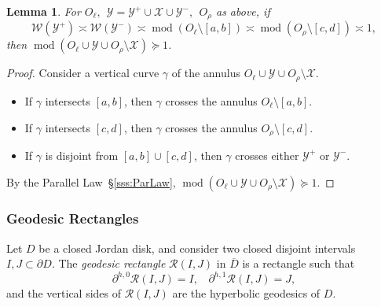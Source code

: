 \documentclass{amsart}
\renewcommand{\sp}{{\ \ }}
\newcommand{\1}{{\mathbb 1 }}
\newcommand{\Width}{{\mathcal W}}
\newcommand\YY{\mathcal{Y}}
\newcommand\RR{\mathcal{R}}
\newcommand\XX{\mathcal{X}}
\newcommand\ovl{\overline}
\newtheorem{lem}[thm]{Lemma}
\theoremstyle{remark}
\numberwithin{equation}{section}
\theoremstyle{definition}
\renewcommand{\mod}{\operatorname{mod}}
\begin{document}
\begin{lem}
\label{lem:A:encl form}
For $O_\ell,\sp \YY=\YY^+\cup \XX\cup \YY^-,\sp O_\rho$ as above, if  
\[\Width(\YY^+)\asymp \Width(\YY^-)\asymp \mod (O_\ell \setminus [a,b])\asymp \mod (O_\rho \setminus [c,d])\asymp 1, \]
then $\mod (O_\ell \cup \YY \cup O_\rho \setminus \XX) \succeq 1$.
\end{lem}
\begin{proof}
Consider a vertical curve $\gamma$ of the annulus $O_\ell \cup \YY \cup O_\rho \setminus \XX$. 
\begin{itemize}
\item If $\gamma$ intersects $[a,b]$, then $\gamma$ crosses the annulus $O_\ell\setminus [a,b]$. 
\item If $\gamma$ intersects $[c,d]$, then $\gamma$ crosses the annulus $O_\rho\setminus [c,d]$. 
\item If $\gamma$ is disjoint from $[a,b]\cup [c,d]$, then $\gamma$ crosses either $\YY^+$ or $\YY^-$.
\end{itemize}
By the Parallel Law~\S\ref{sss:ParLaw}, $\mod (O_\ell \cup \YY \cup O_\rho \setminus \XX) \succeq 1$.
\end{proof}




\subsubsection{Geodesic Rectangles}
\label{sss:GeodRect}
Let $D$ be a closed Jordan disk, and consider two closed disjoint intervals $I,J\subset \partial D$. The \emph{geodesic rectangle} $\RR(I,J)$ in $\ovl D$ is a rectangle such that \[\partial^{h,0} \RR(I,J)=I,\sp\sp \partial^{h,1}\RR(I,J)=J,\]
and the vertical sides of $\RR(I,J)$ are the hyperbolic geodesics of $D$.
\end{document}
